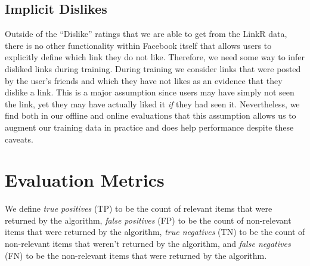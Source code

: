 \subsection{Implicit Dislikes}

Outside of the ``Dislike'' ratings that we are able to get from the
LinkR data, there is no other functionality within Facebook itself
that allows users to explicitly define which link they do not
like. Therefore, we need some way to infer disliked links during
training. During training we consider links that were posted by the
user's friends and which they have not likes as an evidence that they
dislike a link. This is a major assumption since users may have simply
not seen the link, yet they may have actually liked it \emph{if} they
had seen it.  Nevertheless, we find both in our offline and online
evaluations that this assumption allows us to augment our training
data in practice and does help performance despite these caveats.

\section{Evaluation Metrics}
\label{sec:map}

We define \emph{true positives} (TP) to be the count of relevant items
that were returned by the algorithm, \emph{false positives} (FP) to be the
count of non-relevant items that were returned by the algorithm, \emph{true
negatives} (TN) to be the count of non-relevant items that weren't
returned by the algorithm, and \emph{false negatives} (FN) to be the
non-relevant items that were returned by the algorithm.

